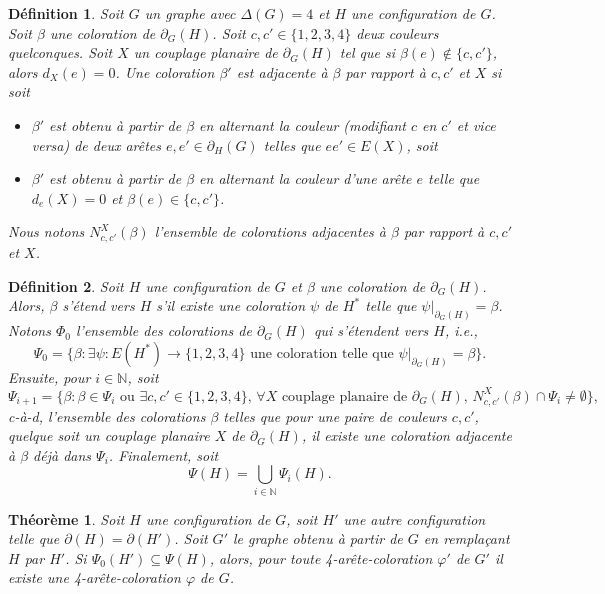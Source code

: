 \documentclass[10pt,a4paper]{article}
\newtheorem{definition}{Définition}
\newtheorem{theorem}{Théorème}
\begin{document}
\begin{definition}
Soit $G$ un graphe avec $\Delta(G)=4$ et $H$ une configuration de $G$.
Soit $\beta$ une coloration de $\partial_G(H)$. Soit $c,c'\in \{1,2,3,4\}$ deux couleurs quelconques. Soit $X$ un couplage planaire de $\partial_G(H)$ tel que si $\beta(e)\notin \{c,c'\}$, alors $d_X(e)=0$. Une coloration $\beta'$ est \emph{adjacente} à $\beta$ par rapport à $c,c'$ et $X$ si soit
\begin{itemize}
\item $\beta'$ est obtenu à partir de $\beta$ en alternant la couleur (modifiant $c$ en $c'$ et vice versa) de deux arêtes $e,e'\in \partial_H(G)$ telles que $ee'\in E(X)$, soit
\item $\beta'$ est obtenu à partir de $\beta$ en alternant la couleur d'une arête $e$ telle que $d_e(X)=0$ et $\beta(e)\in\{c,c'\}$.
\end{itemize}
Nous notons $N^X_{c,c'}(\beta)$ l'ensemble de colorations adjacentes à $\beta$ par rapport à $c,c'$ et $X$.
\end{definition}

\begin{definition}
Soit $H$ une configuration de $G$ et $\beta$ une coloration de $\partial_G(H)$. Alors, $\beta$ \emph{s'étend} vers $H$ s'il existe une coloration $\psi$ de $H^*$ telle que $\psi|_{\partial_G(H)} = \beta$. Notons $\Phi_0$ l'ensemble des colorations de $\partial_G(H)$ qui s'étendent vers $H$, i.e.,
$$
\Psi_0 = \{\beta : \exists \psi : E(H^*)\to\{1,2,3,4\} \textrm{ une coloration telle que } \psi|_{\partial_G(H)} = \beta\}.
$$
Ensuite, pour $i\in\mathbb{N}$, soit
$$
\Psi_{i+1} = 
\{ 
\beta : 
\beta\in \Psi_i
\textrm{ ou }
\exists c,c'\in \{1,2,3,4\},\, 
\forall X\textrm{ couplage planaire de $\partial_G(H)$, }
N^X_{c,c'}(\beta) \cap \Psi_i \neq \emptyset 
\},
$$
c-à-d, l'ensemble des colorations $\beta$ telles que pour une paire de couleurs $c,c'$, quelque soit un couplage planaire $X$ de $\partial_G(H)$, il existe une coloration adjacente à $\beta$ déjà dans $\Psi_{i}$. Finalement, soit
$$
\Psi(H)=\bigcup_{i\in \mathbb{N}} \Psi_i(H).
$$
\end{definition}

\begin{theorem}
Soit $H$ une configuration de $G$, soit $H'$ une autre configuration telle que $\partial(H)=\partial(H')$. Soit $G'$ le graphe obtenu à partir de $G$ en remplaçant $H$ par $H'$.
Si $\Psi_0(H')\subseteq \Psi(H)$, alors, pour toute 4-arête-coloration $\varphi'$ de $G'$ il existe une 4-arête-coloration $\varphi$ de $G$.
\label{th:red}
\end{theorem}
\end{document}
